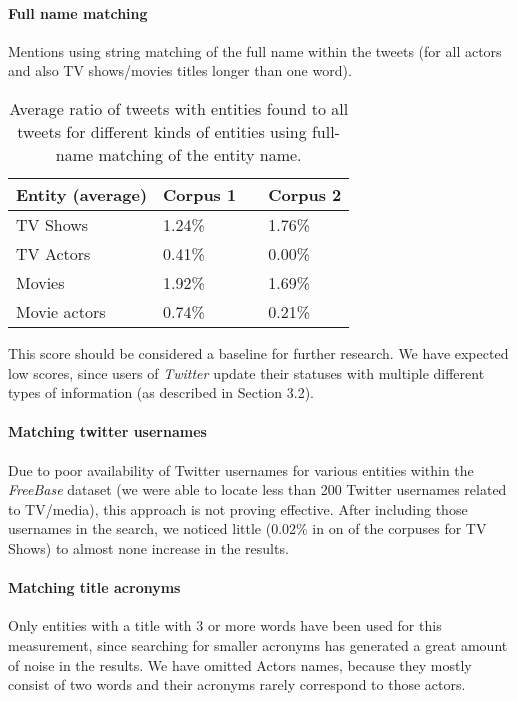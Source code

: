 \paragraph{Full name matching}
Mentions using string matching of the full name within the tweets (for all actors and also TV shows/movies titles longer
than one word).

\begin{table}[h!]
  \begin{center}
    \begin{tabular}{ | p{4cm} | p{2cm} | p{1cm}| p{2cm} | } \hline
      Entity (average) & Corpus 1 & & Corpus 2 \\ \hline
      TV Shows & 1.24\% & & 1.76\% \\ \hline
      TV Actors & 0.41\% & & 0.00\% \\ \hline
      Movies & 1.92\% & & 1.69\% \\ \hline
      Movie actors & 0.74\% & & 0.21\% \\ \hline
    \end{tabular}
    \caption{Average ratio of tweets with entities found to all tweets for different kinds of entities using full-name matching of the entity name.}
  \end{center}
\end{table}

This score should be considered a baseline for further research. We have expected low scores, since users of \textit{Twitter} update their statuses with multiple different types of information (as described in Section 3.2).

\paragraph{Matching twitter usernames}
Due to poor availability of Twitter usernames for various entities within the \textit{FreeBase} dataset (we were able to locate less than 200 Twitter
usernames related to TV/media), this approach is not proving effective. After including those usernames in the search,
we noticed little (0.02\% in on of the corpuses for TV Shows) to almost none increase in the results.

\paragraph{Matching title acronyms}
Only entities with a title with 3 or more words have been used for this measurement, since searching
for smaller acronyms has generated a great amount of noise in the results. We have omitted Actors names, because
they mostly consist of two words and their acronyms rarely correspond to those actors.

